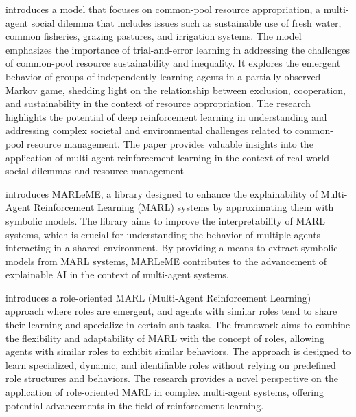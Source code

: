 \documentclass{ecai}
\newcounter{relation}
\begin{document}
\citep{Perolat2017} introduces a model that focuses on common-pool resource appropriation, a multi-agent social dilemma that includes issues such as sustainable use of fresh water, common fisheries, grazing pastures, and irrigation systems. The model emphasizes the importance of trial-and-error learning in addressing the challenges of common-pool resource sustainability and inequality. It explores the emergent behavior of groups of independently learning agents in a partially observed Markov game, shedding light on the relationship between exclusion, cooperation, and sustainability in the context of resource appropriation. The research highlights the potential of deep reinforcement learning in understanding and addressing complex societal and environmental challenges related to common-pool resource management. The paper provides valuable insights into the application of multi-agent reinforcement learning in the context of real-world social dilemmas and resource management

\citep{Kazhdan2020} introduces MARLeME, a library designed to enhance the explainability of Multi-Agent Reinforcement Learning (MARL) systems by approximating them with symbolic models. The library aims to improve the interpretability of MARL systems, which is crucial for understanding the behavior of multiple agents interacting in a shared environment. By providing a means to extract symbolic models from MARL systems, MARLeME contributes to the advancement of explainable AI in the context of multi-agent systems.

\citep{Wang2020} introduces a role-oriented MARL (Multi-Agent Reinforcement Learning) approach where roles are emergent, and agents with similar roles tend to share their learning and specialize in certain sub-tasks. The framework aims to combine the flexibility and adaptability of MARL with the concept of roles, allowing agents with similar roles to exhibit similar behaviors. The approach is designed to learn specialized, dynamic, and identifiable roles without relying on predefined role structures and behaviors. The research provides a novel perspective on the application of role-oriented MARL in complex multi-agent systems, offering potential advancements in the field of reinforcement learning.
\end{document}
